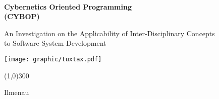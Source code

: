%
%
%
%
%
%
%

\begin{center}
    \begin{Large}
        \authormacro\\
    \end{Large}
    \vspace*{1cm}
    \begin{huge}
        \textbf{Cybernetics Oriented Programming\\
        (CYBOP)}\\
    \end{huge}
    \vspace{1cm}
    \begin{normalsize}
        An Investigation on the Applicability of Inter-Disciplinary Concepts\\
        to Software System Development\\
    \end{normalsize}
    \vspace{8cm}
    \begin{normalsize}
        \texttt{[image: graphic/tuxtax.pdf]}\\
    \end{normalsize}
    \line(1,0){300}\\
    \begin{small}
        Ilmenau
    \end{small}
\end{center}
